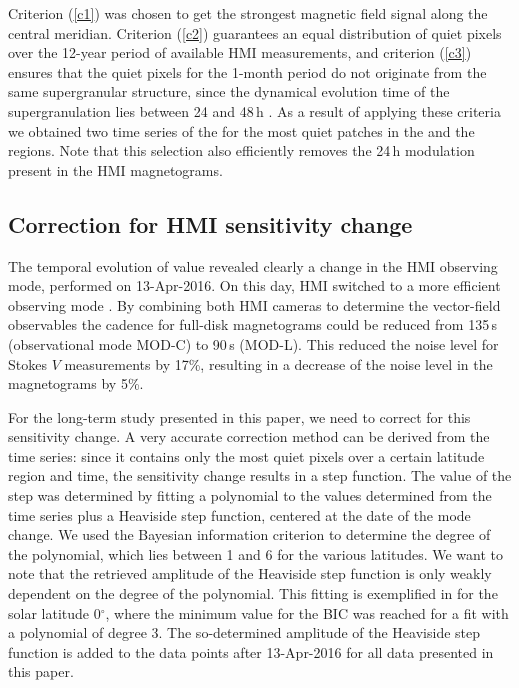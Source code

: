\documentclass{aa}
\begin{document}
Criterion (\ref{c1}) was chosen to get the strongest magnetic field signal along the central meridian. 
Criterion
(\ref{c2}) guarantees an equal distribution of quiet pixels over the 12-year period of available HMI measurements, and 
criterion
(\ref{c3}) ensures that the quiet pixels for the 1-month period do not originate from the same supergranular structure, since the dynamical evolution time of the supergranulation lies between 24 and 48\,h \cite[]{2010LRSP....7....2R}. 
As a result of applying these criteria we obtained
two time series of the \brms{} for the most quiet patches in the \NW{} and the \IN{} regions. 
Note that this selection also efficiently removes the 24\,h modulation present in the HMI magnetograms.

\subsection{Correction for HMI sensitivity change\label{sensicorr}}

The temporal evolution of \inw{} \brms{} value
revealed clearly a change in the HMI observing mode, performed on 13-Apr-2016. On this day, HMI switched to a more efficient observing mode \cite[see][]{2018SoPh..293...45H,2014SoPh..289.3483H,2016SoPh..291.1887C}. By combining both HMI cameras to determine the vector-field observables the cadence for full-disk magnetograms could be reduced from 135\,s (observational mode MOD-C) to 90\,s (MOD-L). This reduced the noise level for Stokes $V$ measurements by 17\%, resulting in a decrease of the noise level in the \los{} magnetograms by 5\%.

For the long-term study presented in this paper, we need to correct for this sensitivity change. A very accurate correction method can be derived from the \inw{} time series: since it contains only the most quiet pixels over a certain latitude region and time, the sensitivity change results in a step function. The value of the step was determined by fitting a polynomial to the \brms{} values determined from the \inw{} time series plus a Heaviside step function, centered at the date of the mode change. We used the Bayesian information criterion \cite[BIC,][]{Stoica2004} to determine the degree of the polynomial, which lies between 1 and 6 for the various latitudes. We want to note that the retrieved amplitude of the Heaviside step function is only weakly dependent on the degree of the polynomial. This fitting is exemplified in  for the solar latitude 0$^\circ$, where the minimum value for the BIC was reached for a fit with a polynomial of 
degree 3. 
The so-determined amplitude of the Heaviside step function is added to the 
\brms{}
data points after 13-Apr-2016 for all data presented in this paper.
\end{document}
